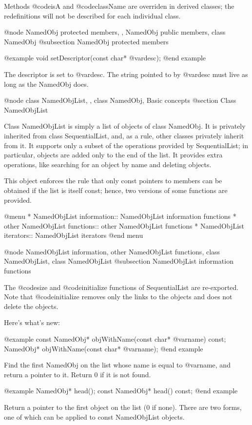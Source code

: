 Methods @code{isA} and @code{className} are overriden in derived
classes; the redefinitions will not be described for each individual
class.

@node NamedObj protected members,  , NamedObj public members, class NamedObj
@subsection NamedObj protected members

@example
void setDescriptor(const char* @var{desc});
@end example

The descriptor is set to @var{desc}.  The string pointed to by
@var{desc} must live as long as the NamedObj does.

@node class NamedObjList,  , class NamedObj, Basic concepts
@section Class NamedObjList

Class NamedObjList is simply a list of objects of class NamedObj.
It is privately inherited from class SequentialList, and, as a rule,
other classes privately inherit from it.  It supports only a subset
of the operations provided by SequentialList; in particular, objects
are added only to the end of the list.  It provides extra operations,
like searching for an object by name and deleting objects.

This object enforces the rule that only const pointers to members can
be obtained if the list is itself const; hence, two versions of some
functions are provided.

@menu
* NamedObjList information::    NamedObjList information functions
* other NamedObjList functions::  other NamedObjList functions
* NamedObjList iterators::      NamedObjList iterators
@end menu

@node NamedObjList information, other NamedObjList functions, class NamedObjList, class NamedObjList
@subsection NamedObjList information functions

The @code{size} and @code{initialize} functions of SequentialList
are re-exported.  Note that @code{initialize} removes only the links
to the objects and does not delete the objects.

Here's what's new:

@example
const NamedObj* objWithName(const char* @var{name}) const;
NamedObj* objWithName(const char* @var{name});
@end example

Find the first NamedObj on the list whose name is equal to @var{name},
and return a pointer to it.  Return 0 if it is not found.

@example
NamedObj* head();
const NamedObj* head() const;
@end example

Return a pointer to the first object on the list (0 if none).  There
are two forms, one of which can be applied to const NamedObjList objects.

